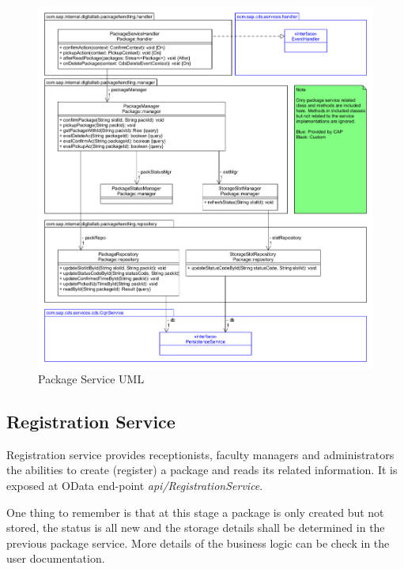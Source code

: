 \begin{figure}[!h]
    \centering
    \includegraphics[width=1\linewidth]{images/service_class_diagrams/package_service_class_diagram.png}
    \caption{Package Service UML}
    \label{fig:package_service_uml}
\end{figure}
\pagebreak



\subsection{Registration Service}

Registration service provides receptionists, faculty managers and administrators the abilities to create (register) a package and reads its related information. It is exposed at OData end-point \textit{api/RegistrationService}. 

\bigskip
One thing to remember is that at this stage a package is only created but not stored, the status is all new and the storage details shall be determined in the previous package service. More details of the business logic can be check in the user documentation.

